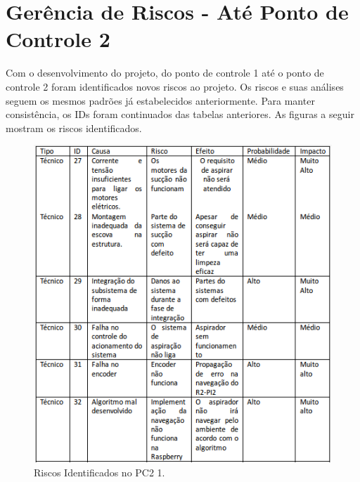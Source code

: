\section{Gerência de Riscos - Até Ponto de Controle 2}

Com o desenvolvimento do projeto, do ponto de controle 1 até o ponto de controle 2 foram identificados novos riscos ao projeto. Os riscos e suas análises seguem os mesmos padrões já estabelecidos anteriormente. Para manter consistência, os IDs foram continuados das tabelas anteriores. As figuras a seguir mostram os riscos identificados.

\begin{figure}[H]
	\centering
	\includegraphics[scale=1]{figuras/riscos_pc2_1.png}
	\caption{Riscos Identificados no PC2 1.}
	\label{img:riscospc21}
\end{figure}



